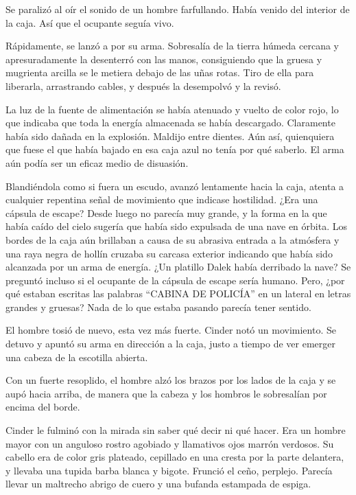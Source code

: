 Se paralizó al oír el sonido de un hombre farfullando. Había venido del interior de la caja. Así que el ocupante seguía vivo. 

Rápidamente, se lanzó a por su arma. Sobresalía de la tierra húmeda cercana y apresuradamente la desenterró con las manos, consiguiendo que la gruesa y mugrienta arcilla se le metiera debajo de las uñas rotas. Tiro de ella para liberarla, arrastrando cables, y después la desempolvó y la revisó. 

La luz de la fuente de alimentación se había atenuado y vuelto de color rojo, lo que indicaba que toda la energía almacenada se había descargado. Claramente había sido dañada en la explosión. Maldijo entre dientes. Aún así, quienquiera que fuese el que había bajado en esa caja azul no tenía por qué saberlo. El arma aún podía ser un eficaz medio de disuasión. 

Blandiéndola como si fuera un escudo, avanzó lentamente hacia la caja, atenta a cualquier repentina señal de movimiento que indicase hostilidad. ¿Era una cápsula de escape? Desde luego no parecía muy grande, y la forma en la que había caído del cielo sugería que había sido expulsada de una nave en órbita. Los bordes de la caja aún brillaban a causa de su abrasiva entrada a la atmósfera y una raya negra de hollín cruzaba su carcasa exterior indicando que había sido alcanzada por un arma de energía. ¿Un platillo Dalek había derribado la nave? Se preguntó incluso si el ocupante de la cápsula de escape sería humano. Pero, ¿por qué estaban escritas las palabras “CABINA DE POLICÍA” en un lateral en letras grandes y gruesas? Nada de lo que estaba pasando parecía tener sentido. 

El hombre tosió de nuevo, esta vez más fuerte. Cinder notó un movimiento. Se detuvo y apuntó su arma en dirección a la caja, justo a tiempo de ver emerger una cabeza de la escotilla abierta. 

Con un fuerte resoplido, el hombre alzó los brazos por los lados de la caja y se aupó hacia arriba, de manera que la cabeza y los hombros le sobresalían por encima del borde. 

Cinder le fulminó con la mirada sin saber qué decir ni qué hacer. Era un hombre mayor con un anguloso rostro agobiado y llamativos ojos marrón verdosos. Su cabello era de color gris plateado, cepillado en una cresta por la parte delantera, y llevaba una tupida barba blanca y bigote. Frunció el ceño, perplejo. Parecía llevar un maltrecho abrigo de cuero y una bufanda estampada de espiga. 



